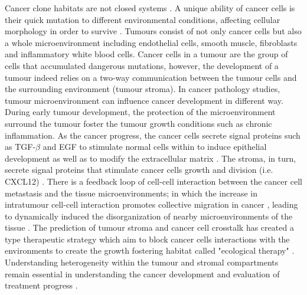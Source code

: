 Cancer clone habitats are not closed systems \cite{greaves2012clonal}. A unique ability of cancer cells is their quick mutation to different environmental conditions, affecting cellular morphology in order to survive \cite{clark2015modes}. Tumours consist of not only cancer cells but also a whole microenvironment including endothelial cells, smooth muscle, fibroblasts and inflammatory white blood cells. Cancer cells in a tumour are the group of cells that accumulated dangerous mutations, however, the development of a tumour indeed relies on a two-way communication between the tumour cells and the surrounding environment (tumour stroma). In cancer pathology studies, tumour microenvironment can influence cancer development in different way. During early tumour development, the protection of the microenvironment surround the tumour foster the tumour growth conditions such as chronic inflammation. As the cancer progress, the cancer cells secrete signal proteins such as TGF-$\beta$ and EGF to stimulate normal cells within to induce epithelial development as well as to modify the extracellular matrix \cite{beck2011systematic,BREMNES2011209}. The stroma, in turn, secrete signal proteins that stimulate cancer cells growth and division (i.e. CXCL12) \cite{kumar2018analysis,wang2017role}. There is a feedback loop of cell-cell interaction between the cancer cell metastasis and the tissue microenvironments; in which the increase in intratumour cell-cell interaction promotes collective migration in cancer \cite{friedl2011cancer, whiteside2008tumor}, leading to dynamically induced the disorganization of nearby microenvironments of the tissue \cite{friedl2012classifying, canel2013cadherin, almendro2013cellular, roussos2011chemotaxis, zervantonakis2012three}. The prediction of tumour stroma and cancer cell crosstalk has created a type therapeutic strategy which aim to block cancer cells interactions with the environments to create the growth fostering habitat called "ecological therapy" \cite{pienta2008ecological, calabrese2007perivascular, bissell2011don}. Understanding heterogeneity within the tumour and stromal compartments remain essential in understanding the cancer development and evaluation of treatment progress \cite{pages2010immune}.

